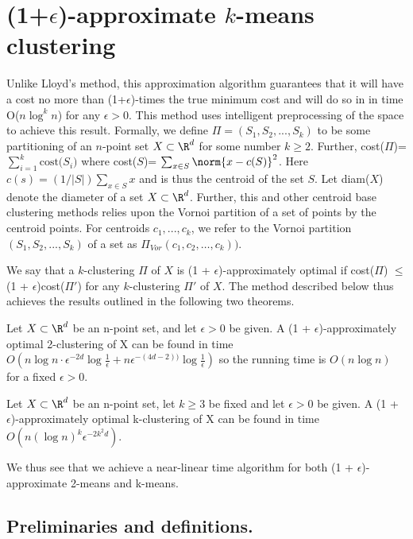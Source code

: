 \section{(1+$\epsilon$)-approximate $k$-means clustering}

Unlike Lloyd's method, this approximation algorithm guarantees that it will have
a cost no more than (1+$\epsilon$)-times the true minimum cost and will do so in
in time O($n \log^k n$) for any $\epsilon>0$. This method uses intelligent
preprocessing of the space to achieve this result. Formally, we define
$\Pi = (S_1, S_2, ..., S_k)$ to be some partitioning of an $n$-point set
$X \subset \R^d$ for some number $k \geq 2$. Further, cost($\Pi$)=$\sum_{i=1}^k \text{cost(}S_i)$ where cost($S$)=
$\sum_{x \in S} \norm{x-c(S)}^2$. Here $c(s)=(1/|S|) \sum_{x \in S} x$ and is
thus the centroid of the set $S$. Let diam($X$) denote the diameter of a set
$X \subset \R^d$. Further, this and other centroid base clustering methods relies upon the Vornoi partition of a set of points by the centroid points.
For centroids $c_1,...,c_k$, we refer to the Vornoi partition $(S_1,S_2,...,S_k)$ of a set
as $\Pi_{Vor}(c_1, c_2, \dots, c_k))$.

We say that a $k$-clustering $\Pi$ of $X$ is (1 + $\epsilon$)-approximately optimal if cost($\Pi$) $\leq$ (1 + $\epsilon$)cost($\Pi'$) for any $k$-clustering $\Pi'$ of $X$. The method described below thus achieves the results outlined in the following two theorems.

\begin{theorem}
Let $X \subset \R^d$ be an n-point set, and let $\epsilon >0$ be given. A (1 + $\epsilon$)-approximately optimal 2-clustering of X can be found in time $O(n \log n \cdot \epsilon^{-2d} \log \frac{1}{\epsilon} + n \epsilon^{-(4d-2))} \log \frac{1}{\epsilon})$ so the running time is $O(n \log n)$ for a fixed $\epsilon>0$.
\end{theorem}

\begin{theorem}
Let $X \subset \R^d$ be an n-point set, let $k \geq 3$ be fixed and let $\epsilon >0$ be given. A (1 + $\epsilon$)-approximately optimal k-clustering of X can be found in time $O(n(\log n)^k \epsilon^{-2k^2d})$.
\end{theorem}

We thus see that we achieve a near-linear time algorithm for both (1 + $\epsilon$)-approximate 2-means and k-means.

\subsection{Preliminaries and definitions.}


